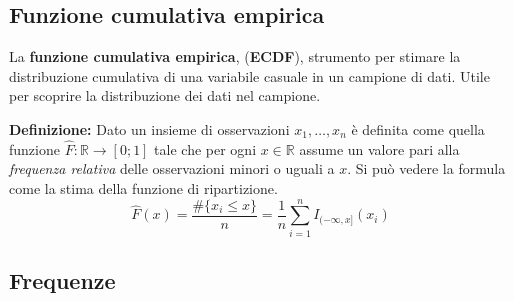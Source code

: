 \documentclass{article}
\begin{document}
    \subsection{Funzione cumulativa empirica}
      La \textbf{funzione cumulativa empirica}, (\textbf{ECDF}), strumento per stimare la distribuzione cumulativa di una variabile casuale in un campione di dati. Utile per scoprire la distribuzione dei dati nel campione. 
    \begin{tcolorbox}
      \textbf{Definizione:} Dato un insieme di osservazioni ${x_1, \dots, x_n}$ è definita come quella funzione $\hat{F}:\mathbb{R}\to[0;1]$ tale che per ogni $x\in\mathbb{R}$ assume un valore pari alla \textit{frequenza relativa} delle osservazioni minori o uguali a $x$. Si può vedere la formula come la stima della funzione di ripartizione.
      $$\hat{F}(x)=\frac{\# \{x_i\le x\}}{n}=\frac{1}{n}\sum_{i=1}^{n}I_{(-\infty,x]}(x_i)$$

    \end{tcolorbox}

    \subsection{Frequenze}
\end{document}
